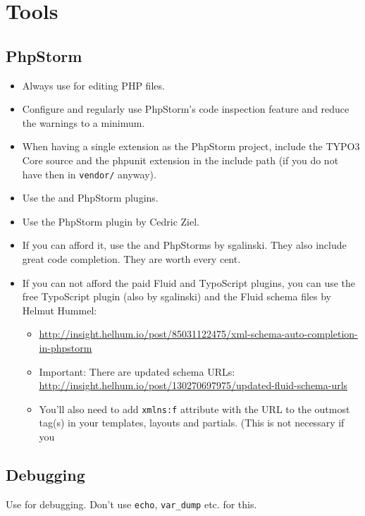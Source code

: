 \chapter{Tools}

\section{PhpStorm}

\begin{itemize}
  \item Always use  for editing PHP files.
  \item Configure and regularly use PhpStorm’s code inspection feature and reduce the warnings to a minimum.
  \item When having a single extension as the PhpStorm project, include the TYPO3 Core source and the phpunit extension in the include path (if you do not have then in \texttt{vendor/} anyway).
  \item Use the  and  PhpStorm plugins.
  \item Use the  PhpStorm plugin by Cedric Ziel.
  \item If you can afford it, use the  and  PhpStorms by sgalinski. They also include great code completion. They are worth every cent.
  \item If you can not afford the paid Fluid and TypoScript plugins, you can use the free TypoScript plugin (also by sgalinski) and the Fluid schema files by Helmut Hummel:
    \begin{itemize}
      \item \url{http://insight.helhum.io/post/85031122475/xml-schema-auto-completion-in-phpstorm}
      \item Important: There are updated schema URLs:\\\url{http://insight.helhum.io/post/130270697975/updated-fluid-schema-urls}
      \item You’ll also need to add \texttt{xmlns:f} attribute with the URL to the outmost tag(s) in your templates, layouts and partials. (This is not necessary if you
    \end{itemize}
\end{itemize}


\section{Debugging}
Use  for debugging. Don’t use \texttt{echo}, \texttt{var\_dump}  etc. for this.


